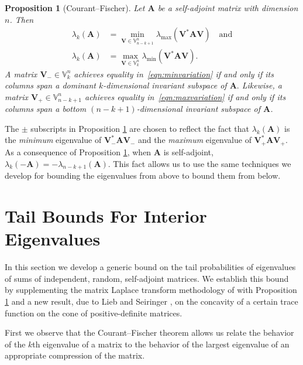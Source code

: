 \documentclass[11pt,letterpaper,twoside,reqno,nosumlimits]{amsart}
\renewcommand{\star}{*}
\newcommand{\mat}[1]{\ensuremath{\bm{#1}}} %
\newcommand{\lambdamax}[1]{\ensuremath{\lambda_{\mathrm{max}}\left(#1\right)}}
\newcommand{\lambdamin}[1]{\ensuremath{\lambda_{\mathrm{min}}\left(#1\right)}}
\newcommand{\Isom}[2]{\ensuremath{\mathbb{V}_{#1}^{#2}}}
\newtheorem{prop}{Proposition}
\theoremstyle{remark}
\numberwithin{equation}{section}
\numberwithin{thm}{section}
\numberwithin{prop}{section}
\numberwithin{defn}{section}
\numberwithin{remark}{section}
\begin{document}
\begin{prop}[Courant--Fischer]
\label{prop:isometrycf}
Let $\mat{A}$ be a self-adjoint matrix with dimension $n$. Then
\begin{align}
\lambda_k(\mat{A}) & = \min_{\mat{V} \in \Isom{n-k+1}{n}} \lambdamax{\mat{V}^\star\mat{AV}} \quad \text{and}
\label{eqn:maxvariation} \\
\lambda_k(\mat{A}) & = \max_{\mat{V} \in \Isom{k}{n}} \lambdamin{\mat{V}^\star \mat{AV}}. \label{eqn:minvariation}
\end{align}
A matrix $\mat{V}_- \in \Isom{k}{n}$ achieves equality in~\eqref{eqn:minvariation} if and only if its columns span a dominant $k$-dimensional invariant subspace of $\mat{A}.$ Likewise, a matrix $\mat{V}_+ \in \Isom{n-k+1}{n}$ achieves equality in~\eqref{eqn:maxvariation} if and only if its columns span a bottom $(n-k+1)$-dimensional invariant subspace of $\mat{A}$.
\end{prop}

The $\pm$ subscripts in Proposition \ref{prop:isometrycf} are chosen to reflect the fact that $\lambda_k(\mat{A})$ is the \emph{minimum} eigenvalue of $\mat{V}_-^\star\mat{A}\mat{V}_-$ and the \emph{maximum} eigenvalue of $\mat{V}_+^\star \mat{A} \mat{V}_+.$ 
As a consequence of Proposition \ref{prop:isometrycf}, when $\mat{A}$ is self-adjoint, \mbox{$\lambda_k(-\mat{A}) = -\lambda_{n-k+1}(\mat{A}).$} This fact allows us to use the same techniques we develop for bounding the eigenvalues from above to bound them from below.

\section{ Tail Bounds For Interior Eigenvalues}
\label{sec:laplacetransform}
In this section we develop a generic bound on the tail probabilities of eigenvalues of sums of independent, random, self-adjoint matrices. We establish this bound by supplementing the matrix Laplace transform methodology of \cite{T10a} with Proposition \ref{prop:isometrycf} and a new result, due to Lieb and Seiringer \cite{LS05}, on the concavity of a certain trace function on the cone of positive-definite matrices.

 First we observe that the Courant--Fischer theorem allows us relate the behavior of the $k$th eigenvalue of a matrix to the behavior of the largest eigenvalue of an appropriate compression of the matrix.
\end{document}
